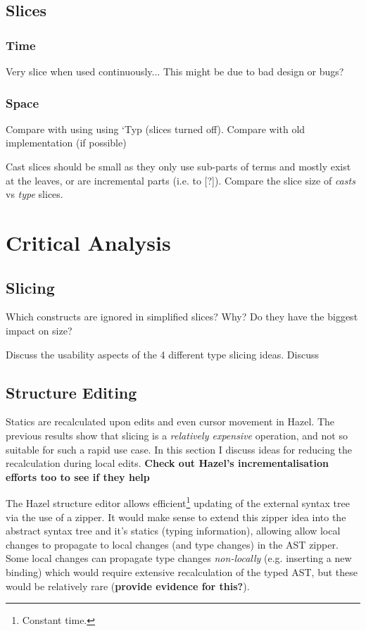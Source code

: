 \subsection{Slices}
\subsubsection{Time}
Very slice when used continuously... This might be due to bad design or bugs?
\subsubsection{Space}
Compare with using using `Typ (slices turned off). Compare with old implementation (if possible)

Cast slices should be small as they only use sub-parts of terms and mostly exist at the leaves, or are incremental parts (i.e. to [?]). Compare the slice size of \textit{casts} vs \textit{type} slices.

\section{Critical Analysis}\label{sec:CriticalAnalysis}
\subsection{Slicing}
Which constructs are ignored in simplified slices? Why? Do they have the biggest impact on size?

Discuss the usability aspects of the 4 different type slicing ideas. Discuss 

\subsection{Structure Editing}
Statics are recalculated upon edits and even cursor movement in Hazel. The previous results show that slicing is a \textit{relatively expensive} operation, and not so suitable for such a rapid use case. In this section I discuss ideas for reducing the recalculation during local edits. \textbf{Check out Hazel's incrementalisation efforts too to see if they help} 

The Hazel structure editor allows efficient\footnote{Constant time.} updating of the external syntax tree via the use of a zipper. It would make sense to extend this zipper idea into the abstract syntax tree and it's statics (typing information), allowing allow local changes to propagate to local changes (and type changes) in the AST zipper. Some local changes can propagate type changes \textit{non-locally} (e.g. inserting a new binding) which would require extensive recalculation of the typed AST, but these would be relatively rare (\textbf{provide evidence for this?}). 


